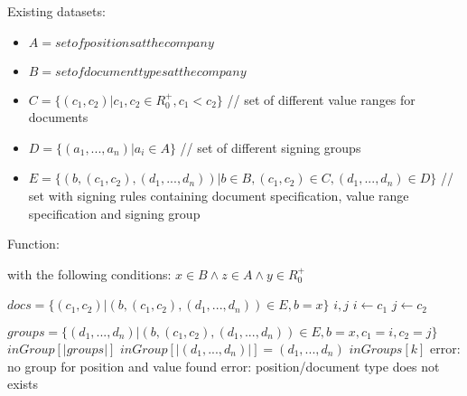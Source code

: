 \begin{minipage}{\textwidth}
	Existing datasets:
	\begin{itemize}
		\item $ A = set of positions at the company $
		\item $ B = set of document types at the company$
		\item $ C = \{(c_1, c_2) | c_1,c_2 \in \!R_0^+, c_1 < c_2 \}$ // set of different value ranges for documents
		\item $ D = \{(a_1, ... , a_n) | a_i \in A \}$ // set of different signing groups
		\item $ E = \{ (b, (c_1,c_2), (d_1, ... , d_n)) | b \in B, (c_1,c_2) \in C, (d_1, ..., d_n) \in D \}$ // set with signing rules containing document specification, value range specification and signing group
	\end{itemize}
	
	Function:
	\begin{algorithmic}
		 with the following conditions: $ x \in B \land z \in A \land y \in \!R_0^+$
		
			\State $ docs = \{ (c_1,c_2) | (b, (c_1, c_2), (d_1, ... , d_n)) \in E, b = x \}$
			\State $i,j$
					\State $ i \gets c_1$
					\State $ j \gets c_2$									
				\EndIf
			\EndFor
			
			\State $ groups = \{ (d_1, ... , d_n) | (b, (c_1, c_2), (d_1, ... , d_n)) \in E, b = x, c_1 = i, c_2 = j \}$
			\State $ inGroup[|groups|]$
					\State $inGroup [|(d_1, ... , d_n)|] = (d_1, ... , d_n)$
				\EndIf
			\EndFor
						\State \Return $inGroups[k]$
					\EndIf
				\EndFor
			\Else
				\State \Return error: no group for position and value found
			\EndIf			
		\Else
			\State \Return error: position/document type does not exists
		\EndIf
		
		\EndFunction
	\end{algorithmic}
\end{minipage}